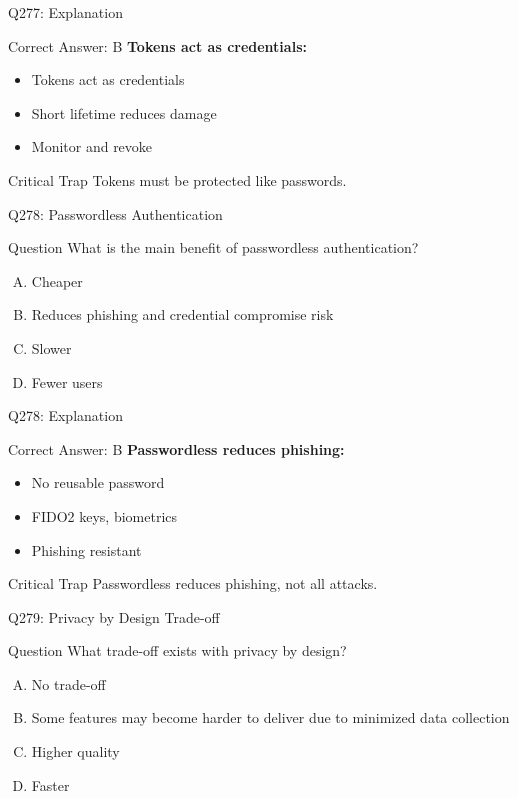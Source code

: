\documentclass{beamer}
\begin{document}
	\begin{frame}{Q277: Explanation}
		\begin{block}{Correct Answer: B}
			\textbf{Tokens act as credentials:}
			\begin{itemize}
				\item Tokens act as credentials
				\item Short lifetime reduces damage
				\item Monitor and revoke
			\end{itemize}
		\end{block}
		\begin{alertblock}{Critical Trap}
			Tokens must be protected like passwords.
		\end{alertblock}
	\end{frame}
	
	\begin{frame}{Q278: Passwordless Authentication}
		\begin{block}{Question}
			What is the main benefit of passwordless authentication?
		\end{block}
		\begin{enumerate}[(A)]
			\item Cheaper
			\item Reduces phishing and credential compromise risk
			\item Slower
			\item Fewer users
		\end{enumerate}
	\end{frame}
	
	\begin{frame}{Q278: Explanation}
		\begin{block}{Correct Answer: B}
			\textbf{Passwordless reduces phishing:}
			\begin{itemize}
				\item No reusable password
				\item FIDO2 keys, biometrics
				\item Phishing resistant
			\end{itemize}
		\end{block}
		\begin{alertblock}{Critical Trap}
			Passwordless reduces phishing, not all attacks.
		\end{alertblock}
	\end{frame}
	
	\begin{frame}{Q279: Privacy by Design Trade-off}
		\begin{block}{Question}
			What trade-off exists with privacy by design?
		\end{block}
		\begin{enumerate}[(A)]
			\item No trade-off
			\item Some features may become harder to deliver due to minimized data collection
			\item Higher quality
			\item Faster
		\end{enumerate}
	\end{frame}
	
\end{document}
